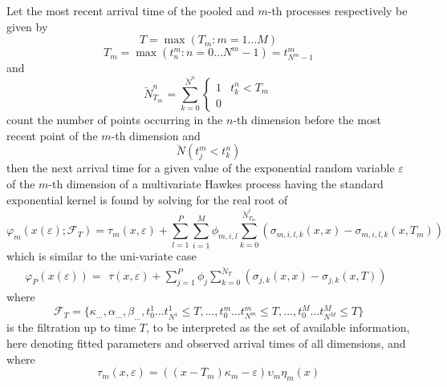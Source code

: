 \documentclass{amsart}
\begin{document}
Let the most recent arrival time of the pooled and $m$-th processes
respectively be given by
\begin{equation}
  T = \max ( T_m : m = 1 \ldots M)
\end{equation}
\begin{equation}
  T^{}_m = \max ( t^m_n : n = 0 \ldots N^m - 1) = t^m_{N^m - 1}
\end{equation}
and
\begin{equation}
  \breve{N}^n_{T_m}^{} = \sum_{k = 0}^{\breve{N}^n} \left\{ \begin{array}{ll}
    1 & t^n_k < T_m\\
    0 & 
  \end{array} \right.
\end{equation}
count the number of points occurring in the $n$-th dimension before the most
recent point of the $m$-th dimension and
\begin{equation}
  \breve{N} ( t_j^m < t_k^n)
\end{equation}
then the next arrival time for a given value of the exponential random
variable $\varepsilon$ of the $m$-th dimension of a multivariate Hawkes
process having the standard exponential kernel is found by solving for the
real root of
\begin{equation}
  \varphi_m ( x ( \varepsilon) ; \mathcal{F}_T) = \tau_m ( x, \varepsilon) +
  \sum_{l = 1}^P \sum_{i = 1}^M \phi_{m, i, l}  \sum_{k =
  0}^{\breve{N}_{T_m}^i} ( \sigma_{m, i, l, k} ( x, x) - \sigma_{m, i, l, k} (
  x, T_m)) \label{mc}
\end{equation}
which is similar to the uni-variate case
\begin{equation}
  \varphi_P ( x ( \varepsilon)) = \begin{array}{l}
    \tau ( x, \varepsilon) + \sum_{j = 1}^P \phi_j  \sum_{k = 0}^{\breve{N}_T}
    ( \sigma_{j, k} ( x, x) - \sigma_{j, k} ( x, T))^{}
  \end{array}
\end{equation}
where
\begin{equation}
  \mathcal{F}_T = \{ \kappa_{\ldots}, \alpha_{\ldots}, \beta_{\ldots}, t^1_0
  \ldots t^1_{N^1} \leqslant T, \ldots, t^m_0 \ldots t^m_{N^m} \leqslant T,
  \ldots, t^M_0 \ldots t^M_{N^M} \leqslant T \}
\end{equation}
is the filtration up to time $T$, to be interpreted as the set of available
information, here denoting fitted parameters and observed arrival times of all
dimensions, and where
\begin{equation}
  \tau_m ( x, \varepsilon) = ( ( x - T_m) \kappa_m - \varepsilon) \upsilon_m
  \eta_m ( x)
\end{equation}
\end{document}
